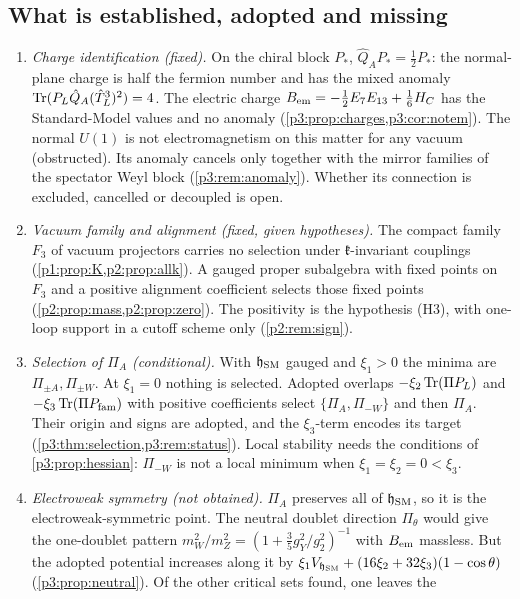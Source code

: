 \subsection{What is established, adopted and missing}

\begin{enumerate}[label=(\arabic*),leftmargin=2.2em]
\item \emph{Charge identification (fixed).} On the chiral block $P_*$, $\hat Q_AP_*=\tfrac12P_*$: the normal-plane charge is half the fermion number and has the
mixed anomaly $\operatorname{Tr}(P_L\hat Q_A(\hat T^3_L)^2)=4$. The electric charge $B_{\rm em}=-\tfrac12E_7E_{13}+\tfrac16H_C$ has the Standard-Model values and no anomaly
(\cref{p3:prop:charges,p3:cor:notem}). The normal $U(1)$ is not electromagnetism on this matter for any vacuum (obstructed). Its anomaly cancels only
together with the mirror families of the spectator Weyl block (\cref{p3:rem:anomaly}). Whether its connection is excluded, cancelled or decoupled is open.
\item \emph{Vacuum family and alignment (fixed, given hypotheses).} The compact family $F_3$ of vacuum projectors carries no selection under $\mathfrak k$-invariant
couplings (\cref{p1:prop:K,p2:prop:allk}). A gauged proper subalgebra with fixed points on $F_3$ and a positive alignment coefficient selects those fixed points
(\cref{p2:prop:mass,p2:prop:zero}). The positivity is the hypothesis (H3), with one-loop support in a cutoff scheme only (\cref{p2:rem:sign}).
\item \emph{Selection of $\Pi_A$ (conditional).} With $\mathfrak h_{\rm SM}$ gauged and $\xi_1>0$ the minima are $\Pi_{\pm A},\Pi_{\pm W}$. At $\xi_1=0$ nothing is
selected. Adopted overlaps $-\xi_2\operatorname{Tr}(\Pi P_L)$ and $-\xi_3\operatorname{Tr}(\Pi P_{\rm fam})$ with positive coefficients select $\{\Pi_A,\Pi_{-W}\}$ and then $\Pi_A$. Their
origin and signs are adopted, and the $\xi_3$-term encodes its target (\cref{p3:thm:selection,p3:rem:status}). Local stability needs the conditions of
\cref{p3:prop:hessian}: $\Pi_{-W}$ is not a local minimum when $\xi_1=\xi_2=0<\xi_3$.
\item \emph{Electroweak symmetry (not obtained).} $\Pi_A$ preserves all of $\mathfrak h_{\rm SM}$, so it is the electroweak-symmetric point. The neutral
doublet direction $\Pi_\theta$ would give the one-doublet pattern $m_W^2/m_Z^2=(1+\tfrac35g_Y^2/g_2^2)^{-1}$ with $B_{\rm em}$ massless. But the adopted potential
increases along it by $\xi_1 V_{\mathfrak h_{\rm SM}}+(16\xi_2+32\xi_3)(1-\cos\theta)$ (\cref{p3:prop:neutral}). Of the other critical sets found, one leaves the

\end{enumerate}
